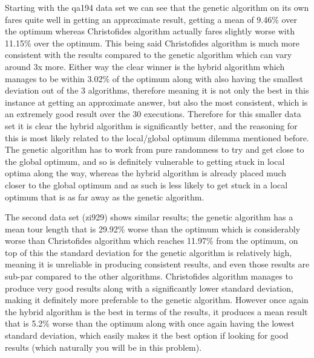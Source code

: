\documentclass[11pt,a4paper,titlepage]{article}
\begin{document}
Starting with the qa194 data set we can see that the genetic algorithm on its own fares quite well in getting an approximate result, getting a mean of 9.46\% over the optimum whereas Christofides algorithm actually fares slightly worse with 11.15\% over the optimum. This being said Christofides algorithm is much more consistent with the results compared to the genetic algorithm which can vary around 3x more. Either way the clear winner is the hybrid algorithm which manages to be within 3.02\% of the optimum along with also having the smallest deviation out of the 3 algorithms, therefore meaning it is not only the best in this instance at getting an approximate answer, but also the most consistent, which is an extremely good result over the 30 executions. Therefore for this smaller data set it is clear the hybrid algorithm is significantly better, and the reasoning for this is most likely related to the local/global optimum dilemma mentioned before. The genetic algorithm has to work from pure randomness to try and get close to the global optimum, and so is definitely vulnerable to getting stuck in local optima along the way, whereas the hybrid algorithm is already placed much closer to the global optimum and as such is less likely to get stuck in a local optimum that is as far away as the genetic algorithm.

The second data set (zi929) shows similar results; the genetic algorithm has a mean tour length that is 29.92\% worse than the optimum which is considerably worse than Christofides algorithm which reaches 11.97\% from the optimum, on top of this the standard deviation for the genetic algorithm is relatively high, meaning it is unreliable in producing consistent results, and even those results are sub-par compared to the other algorithms. Christofides algorithm manages to produce very good results along with a significantly lower standard deviation, making it definitely more preferable to the genetic algorithm. However once again the hybrid algorithm is the best in terms of the results, it produces a mean result that is 5.2\% worse than the optimum along with once again having the lowest standard deviation, which easily makes it the best option if looking for good results (which naturally you will be in this problem).
\end{document}
